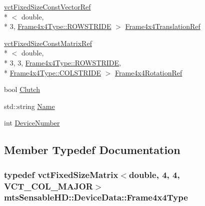 \begin{DoxyCompactItemize}
\hyperlink{classvct_fixed_size_const_vector_ref}{vct\-Fixed\-Size\-Const\-Vector\-Ref}\\*
$<$ double, \\*
3, \hyperlink{classvct_fixed_size_matrix_base_a7ca4cc289d4bd697476f2d37e82e9a38a6c561939f5de9c5e815b889df7662117}{Frame4x4\-Type\-::\-R\-O\-W\-S\-T\-R\-I\-D\-E} $>$ \hyperlink{structmts_sensable_h_d_1_1_device_data_aee2d3dc0deb12ad500c4c57a26106f1b}{Frame4x4\-Translation\-Ref}
\item 
\hyperlink{classvct_fixed_size_const_matrix_ref}{vct\-Fixed\-Size\-Const\-Matrix\-Ref}\\*
$<$ double, \\*
3, 3, \hyperlink{classvct_fixed_size_matrix_base_a7ca4cc289d4bd697476f2d37e82e9a38a6c561939f5de9c5e815b889df7662117}{Frame4x4\-Type\-::\-R\-O\-W\-S\-T\-R\-I\-D\-E}, \\*
\hyperlink{classvct_fixed_size_matrix_base_a7ca4cc289d4bd697476f2d37e82e9a38a920a67cbcd917bab0e46677bf43cb6b8}{Frame4x4\-Type\-::\-C\-O\-L\-S\-T\-R\-I\-D\-E} $>$ \hyperlink{structmts_sensable_h_d_1_1_device_data_a3d47fe8f2f161326ac01587b7ac74d2c}{Frame4x4\-Rotation\-Ref}
\item 
bool \hyperlink{structmts_sensable_h_d_1_1_device_data_a9f16b01377b10aa6b9961fd55dac7cd7}{Clutch}
\item 
std\-::string \hyperlink{structmts_sensable_h_d_1_1_device_data_aa1b15a9026612af14c0b37cca2deb4f2}{Name}
\item 
int \hyperlink{structmts_sensable_h_d_1_1_device_data_adb16cabaccc5633c5a4676f6372e3211}{Device\-Number}
\end{DoxyCompactItemize}


\subsection{Member Typedef Documentation}
\hypertarget{structmts_sensable_h_d_1_1_device_data_a46ac85be135ad15c04fbe2b06a689781}{
\subsubsection[{Frame4x4\-Type}]{\setlength{\rightskip}{0pt plus 5cm}typedef {\bf vct\-Fixed\-Size\-Matrix}$<$double, 4, 4, {\bf V\-C\-T\-\_\-\-C\-O\-L\-\_\-\-M\-A\-J\-O\-R}$>$ {\bf mts\-Sensable\-H\-D\-::\-Device\-Data\-::\-Frame4x4\-Type}}}\label{structmts_sensable_h_d_1_1_device_data_a46ac85be135ad15c04fbe2b06a689781}


